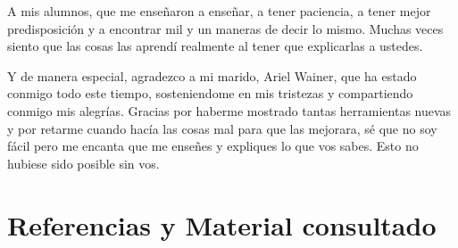 \documentclass[a4paper]{article}
\begin{document}
A mis alumnos, que me enseñaron a enseñar, a tener paciencia, a tener mejor predisposición y a encontrar mil y un maneras de decir lo mismo. Muchas veces siento que las cosas las aprendí realmente al tener que explicarlas a ustedes.

Y de manera especial, agradezco a mi marido, Ariel Wainer, que ha estado conmigo todo este tiempo, sosteniendome en mis tristezas y compartiendo conmigo mis alegrías. Gracias por haberme mostrado tantas herramientas nuevas y por retarme cuando hacía las cosas mal para que las mejorara, sé que no soy fácil pero me encanta que me enseñes y expliques lo que vos sabes. Esto no hubiese sido posible sin vos.


\newpage
\section{Referencias y Material consultado}

\renewcommand\refname{\small}
\end{document}
